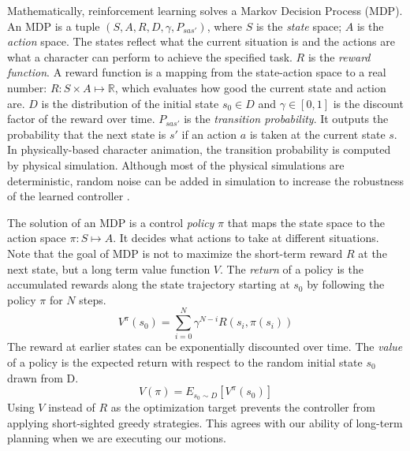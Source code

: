 Mathematically, reinforcement learning solves a Markov Decision Process (MDP). An MDP is a tuple $(S, A, R, D, \gamma, P_{sas'})$, where $S$ is the \emph{state} space; $A$ is the \emph{action} space. The states reflect what the current situation is and the actions are what a character can perform to achieve the specified task. $R$ is the \emph{reward function}. A reward function is a mapping from the state-action space to a real number: $R: S\times A\mapsto \mathbb{R}$, which evaluates how good the current state and action are. $D$ is the distribution of the initial state $s_0 \in D$ and $\gamma \in [0, 1]$ is the discount factor of the reward over time. $P_{sas'}$ is the \emph{transition probability}. It outputs the probability that the next state is $s'$ if an action $a$ is taken at the current state $s$. In physically-based character animation, the transition probability is computed by physical simulation. Although most of the physical simulations are deterministic, random noise can be added in simulation to increase the robustness of the learned controller \cite{Wang:2010}.

The solution of an MDP is a control \emph{policy} $\pi$ that maps the state space to the action space $\pi: S\mapsto A$. It decides what actions to take at different situations. Note that the goal of MDP is not to maximize the short-term reward $R$ at the next state, but a long term value function $V$. The \emph{return} of a policy is the accumulated rewards along the state trajectory starting at $s_0$ by following the policy $\pi$ for $N$ steps.
\begin{displaymath}
V^\pi(s_0)=\sum_{i=0}^N{\gamma^{N-i}R(s_i, \pi(s_i))}
\end{displaymath}
The reward at earlier states can be exponentially discounted over time. The \emph{value} of a policy is the expected return with respect to the random initial state $s_0$ drawn from D.
\begin{equation}
V(\pi)=E_{s_0\sim D}[V^\pi(s_0)]
\label{eq:policyValue}
\end{equation}
Using $V$ instead of $R$ as the optimization target prevents the controller from applying short-sighted greedy strategies. This agrees with our ability of long-term planning when we are executing our motions.

